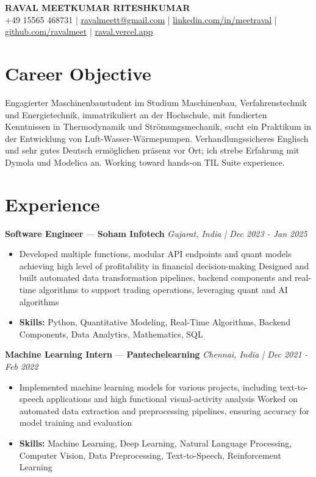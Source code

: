 \documentclass[a4paper,10pt]{article}
\begin{document}
\begin{center}
  {\Large\bfseries RAVAL MEETKUMAR RITESHKUMAR}\\[2pt]
  {\small +49 15565 468731 \;|\; \href{mailto:ravalmeett@gmail.com}{ravalmeett@gmail.com} \;|\; \href{https://www.linkedin.com/in/meetraval/}{linkedin.com/in/meetraval} \;|\; \href{https://github.com/ravalmeet}{github.com/ravalmeet} \;|\; \href{https://raval.vercel.app/}{raval.vercel.app}}
\end{center}
\vspace{-3pt}

\section*{Career Objective}
Engagierter Maschinenbaustudent im Studium Maschinenbau, Verfahrenstechnik und Energietechnik, immatrikuliert an der Hochschule, mit fundierten Kenntnissen in Thermodynamik und Strömungsmechanik, sucht ein Praktikum in der Entwicklung von Luft-Wasser-Wärmepumpen. Verhandlungssicheres Englisch und sehr gutes Deutsch ermöglichen präsenz vor Ort; ich strebe Erfahrung mit Dymola und Modelica an. Working toward hands-on TIL Suite experience.\par

\section*{Experience}
\textbf{Software Engineer} — \textbf{Soham Infotech} \hfill \textit{Gujarat, India \;|\; Dec 2023 - Jan 2025}\par
\vspace{1pt}
\begin{itemize}
  \item Developed multiple functions, modular API endpoints and quant models achieving high level of profitability in financial decision-making Designed and built automated data transformation pipelines, backend components and real-time algorithms to support trading operations, leveraging quant and AI algorithms
  \item \textbf{Skills:} Python, Quantitative Modeling, Real-Time Algorithms, Backend Components, Data Analytics, Mathematics, SQL
\end{itemize}
\vspace{3pt}
\textbf{Machine Learning Intern} — \textbf{Pantechelearning} \hfill \textit{Chennai, India \;|\; Dec 2021 - Feb 2022}\par
\vspace{1pt}
\begin{itemize}
  \item Implemented machine learning models for various projects, including text-to-speech applications and high functional visual-activity analysis Worked on automated data extraction and preprocessing pipelines, ensuring accuracy for model training and evaluation
  \item \textbf{Skills:} Machine Learning, Deep Learning, Natural Language Processing, Computer Vision, Data Preprocessing, Text-to-Speech, Reinforcement Learning
\end{itemize}
\end{document}
